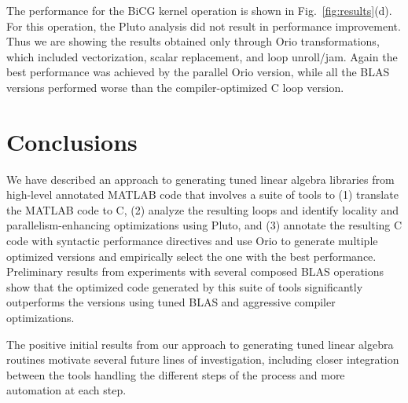 \documentclass[runningheads]{llncs}
\begin{document}
The performance for the BiCG kernel operation is shown in
Fig.~\ref{fig:results}(d). For this operation, the Pluto analysis did not
result in performance improvement. Thus we are showing the results obtained
only through Orio transformations, which included vectorization, scalar
replacement, and loop unroll/jam. Again the best performance was achieved
by the parallel Orio version, while all the BLAS versions performed worse
than the compiler-optimized C loop version.

\section{Conclusions}
\label{sec:conclusion}

We have described an approach to generating tuned linear algebra libraries
from high-level annotated MATLAB code that involves a suite of tools to (1)
translate the MATLAB code to C, (2) analyze the resulting loops and identify
locality and parallelism-enhancing optimizations using Pluto, and (3)
annotate the resulting C code with syntactic performance directives and use
Orio to generate multiple optimized versions and empirically select the one
with the best performance. Preliminary results from experiments with several
composed BLAS operations show that the optimized code generated by this suite
of tools significantly outperforms the versions using tuned BLAS and
aggressive compiler optimizations.

The positive initial results from our approach to generating tuned linear
algebra routines motivate several future lines of investigation, including closer
integration between the tools handling the different steps of the process and 
more automation at each step.

\end{document}
